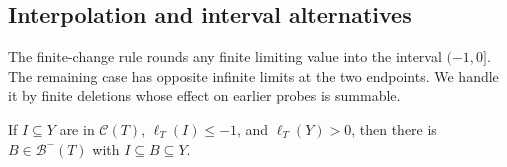 \subsection{Interpolation and interval alternatives}

The finite-change rule rounds any finite limiting value into the
interval $(-1,0]$. The remaining case has opposite infinite limits at
the two endpoints. We handle it by finite deletions whose effect on
earlier probes is summable.

\begin{lemma}[Interpolation]\label{lem:local-interpolation}
If $I\subseteq Y$ are in $\mathcal C(T)$,
$\ell_T(I)\le-1$, and $\ell_T(Y)>0$, then there is
$B\in\mathcal B^-(T)$ with $I\subseteq B\subseteq Y$.
\end{lemma}

